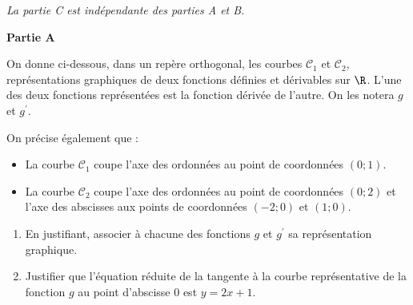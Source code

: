 
\textit{La partie C est indépendante des parties A et B.}

\begin{center}
	\textbf{Partie A}
\end{center}

On donne ci-dessous, dans un repère orthogonal, les courbes $\mathcal{C}_{1}$ et $\mathcal{C}_{2}$, représentations graphiques de deux fonctions définies et dérivables sur $\R$. L'une des deux fonctions représentées est la fonction dérivée de l'autre. On les notera $g$ et $g^{\prime}$.

On précise également que :

\begin{itemize}
	\item La courbe $\mathcal{C}_{1}$ coupe l'axe des ordonnées au point de coordonnées $(0; 1)$.
	\item La courbe $\mathcal{C}_{2}$ coupe l'axe des ordonnées au point de coordonnées $(0; 2)$ et l'axe des abscisses aux points de coordonnées $(-2; 0)$ et $(1; 0)$.
\end{itemize}

\begin{Centrage}
	\begin{GraphiqueTikz}[x=1.9cm,y=0.6cm,Xmin=-3,Xmax=5,Xgrille=1,Xgrilles=1,Ymin=-8,Ymax=7,Ygrille=1,Ygrilles=1]
		\begin{scope}
		\end{scope}
	\end{GraphiqueTikz}
\end{Centrage}

\begin{enumerate}
	\item En justifiant, associer à chacune des fonctions $g$ et $g^{\prime}$ sa représentation graphique.
	\item Justifier que l'équation réduite de la tangente à la courbe représentative de la fonction $g$ au point d'abscisse 0 est $y = 2x + 1$.
\end{enumerate}


